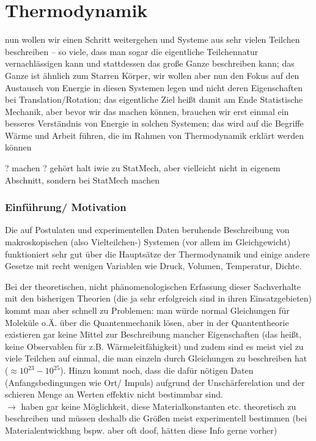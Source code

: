 \documentclass[../class_mech_main.tex]{subfiles}
\begin{document}
\chapter{Thermodynamik}
nun wollen wir einen Schritt weitergehen und Systeme aus sehr vielen Teilchen beschreiben -- so viele, dass man sogar die eigentliche Teilchennatur vernachlässigen kann und stattdessen das große Ganze beschreiben kann; das Ganze ist ähnlich zum Starren Körper, wir wollen aber nun den Fokus auf den Austausch von Energie in diesen Systemen legen und nicht deren Eigenschaften bei Translation/Rotation; das eigentliche Ziel heißt damit am Ende Statistische Mechanik, aber bevor wir das machen können, brauchen wir erst einmal ein besseres Verständnis von Energie in solchen Systemen; das wird auf die Begriffe Wärme und Arbeit führen, die im Rahmen von Thermodynamik erklärt werden können


? machen ? gehört halt iwie zu StatMech, aber vielleicht nicht in eigenem Abschnitt, sondern bei StatMech machen


	\subsection{Einführung/ Motivation}
Die auf Postulaten und experimentellen Daten beruhende Beschreibung von makroskopischen (also Vielteilchen-) Systemen (vor allem im Gleichgewicht) funktioniert sehr gut über die Hauptsätze der Thermodynamik und einige andere Gesetze mit recht wenigen Variablen wie Druck, Volumen, Temperatur, Dichte.

Bei der theoretischen, nicht phänomenologischen Erfassung dieser Sachverhalte mit den bisherigen Theorien (die ja sehr erfolgreich sind in ihren Einsatzgebieten) kommt man aber schnell zu Problemen: man würde normal Gleichungen für Moleküle o.Ä. über die Quantenmechanik lösen, aber in der Quantentheorie existieren gar keine Mittel zur Beschreibung mancher Eigenschaften (das heißt, keine Observablen für z.B. Wärmeleitfähigkeit) und zudem sind es meist viel zu viele Teilchen auf einmal, die man einzeln durch Gleichungen zu beschreiben hat ($\approx 10^{23} - 10^{25}$). Hinzu kommt noch, dass die dafür nötigen Daten (Anfangsbedingungen wie Ort/ Impuls) aufgrund der Unschärferelation und der schieren Menge an Werten effektiv nicht bestimmbar sind. \medskip\\
$\rightarrow$ haben gar keine Möglichkeit, diese Materialkonstanten etc. theoretisch zu beschreiben und müssen deshalb die Größen meist experimentell bestimmen (bei Materialentwicklung bspw. aber oft doof, hätten diese Info gerne vorher)\\
\end{document}

